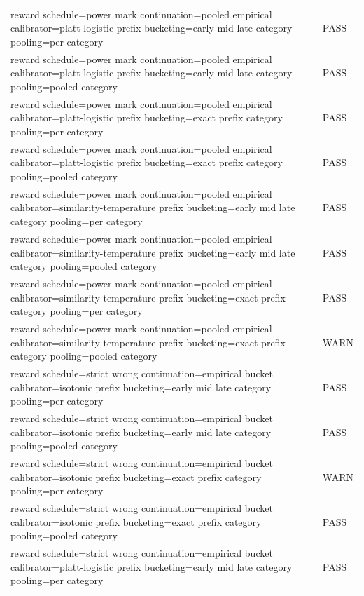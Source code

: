 \begin{table}[h]
\begin{tabular}{ll}
reward schedule=power mark  continuation=pooled empirical  calibrator=platt-logistic  prefix bucketing=early mid late  category pooling=per category & PASS \\
reward schedule=power mark  continuation=pooled empirical  calibrator=platt-logistic  prefix bucketing=early mid late  category pooling=pooled category & PASS \\
reward schedule=power mark  continuation=pooled empirical  calibrator=platt-logistic  prefix bucketing=exact prefix  category pooling=per category & PASS \\
reward schedule=power mark  continuation=pooled empirical  calibrator=platt-logistic  prefix bucketing=exact prefix  category pooling=pooled category & PASS \\
reward schedule=power mark  continuation=pooled empirical  calibrator=similarity-temperature  prefix bucketing=early mid late  category pooling=per category & PASS \\
reward schedule=power mark  continuation=pooled empirical  calibrator=similarity-temperature  prefix bucketing=early mid late  category pooling=pooled category & PASS \\
reward schedule=power mark  continuation=pooled empirical  calibrator=similarity-temperature  prefix bucketing=exact prefix  category pooling=per category & PASS \\
reward schedule=power mark  continuation=pooled empirical  calibrator=similarity-temperature  prefix bucketing=exact prefix  category pooling=pooled category & WARN \\
reward schedule=strict wrong  continuation=empirical bucket  calibrator=isotonic  prefix bucketing=early mid late  category pooling=per category & PASS \\
reward schedule=strict wrong  continuation=empirical bucket  calibrator=isotonic  prefix bucketing=early mid late  category pooling=pooled category & PASS \\
reward schedule=strict wrong  continuation=empirical bucket  calibrator=isotonic  prefix bucketing=exact prefix  category pooling=per category & WARN \\
reward schedule=strict wrong  continuation=empirical bucket  calibrator=isotonic  prefix bucketing=exact prefix  category pooling=pooled category & PASS \\
reward schedule=strict wrong  continuation=empirical bucket  calibrator=platt-logistic  prefix bucketing=early mid late  category pooling=per category & PASS \\

\end{tabular}
\end{table}

